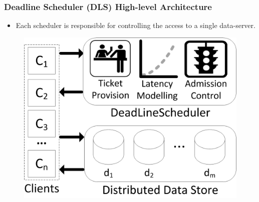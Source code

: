 \documentclass{beamer}
\begin{document}
\begin{frame}
  \frametitle{Deadline Scheduler (DLS) High-level Architecture}
  \begin{itemize}
  \item Each scheduler is responsible for
    controlling the access to a single data-server.
  \end{itemize}
  \begin{figure}
    \begin{center}
      \centerline{\includegraphics[scale=0.90]{img/DLS.png}}
    \end{center}
  \end{figure}
\end{frame}
\end{document}
